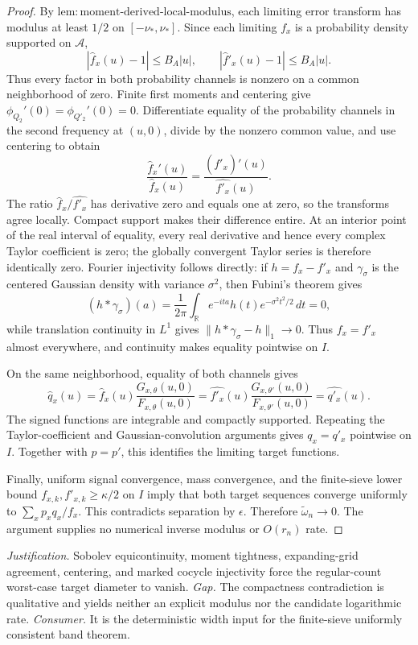 \documentclass{article}
\begin{document}
\begin{proof}
By \(\mathrm{lem{:}moment\text{-}derived\text{-}local\text{-}modulus}\), each limiting error transform has modulus at least \(1/2\) on \([-\nu_*,\nu_*]\). Since each limiting \(f_x\) is a probability density supported on \(\mathcal A\),
\[
 |\widehat f_x(u)-1|\le B_A|u|,
 \qquad |\widehat f'_x(u)-1|\le B_A|u|.
\]
Thus every factor in both probability channels is nonzero on a common neighborhood of zero. Finite first moments and centering give \(\phi_{Q_2}'(0)=\phi_{Q'_2}'(0)=0\). Differentiate equality of the probability channels in the second frequency at \((u,0)\), divide by the nonzero common value, and use centering to obtain
\[
 \frac{\widehat f_x'(u)}{\widehat f_x(u)}
 =\frac{(\widehat{f'_x})'(u)}{\widehat{f'_x}(u)}.
\]
The ratio \(\widehat f_x/\widehat{f'_x}\) has derivative zero and equals one at zero, so the transforms agree locally. Compact support makes their difference entire. At an interior point of the real interval of equality, every real derivative and hence every complex Taylor coefficient is zero; the globally convergent Taylor series is therefore identically zero. Fourier injectivity follows directly: if \(h=f_x-f'_x\) and \(\gamma_\sigma\) is the centered Gaussian density with variance \(\sigma^2\), then Fubini's theorem gives
\[
 (h*\gamma_\sigma)(a)=\frac1{2\pi}\int_{\mathbb R}
 e^{-ita}\widehat h(t)e^{-\sigma^2t^2/2}\,dt=0,
\]
while translation continuity in \(L^1\) gives \(\|h*\gamma_\sigma-h\|_1\to0\). Thus \(f_x=f'_x\) almost everywhere, and continuity makes equality pointwise on \(I\).

On the same neighborhood, equality of both channels gives
\[
 \widehat q_x(u)
 =\widehat f_x(u)\frac{G_{x,\theta}(u,0)}{F_{x,\theta}(u,0)}
 =\widehat{f'_x}(u)\frac{G_{x,\theta'}(u,0)}{F_{x,\theta'}(u,0)}
 =\widehat{q'_x}(u).
\]
The signed functions are integrable and compactly supported. Repeating the Taylor-coefficient and Gaussian-convolution arguments gives \(q_x=q'_x\) pointwise on \(I\). Together with \(p=p'\), this identifies the limiting target functions.

Finally, uniform signal convergence, mass convergence, and the finite-sieve lower bound \(f_{x,k},f'_{x,k}\ge\kappa/2\) on \(I\) imply that both target sequences converge uniformly to \(\sum_xp_xq_x/f_x\). This contradicts separation by \(\epsilon\). Therefore \(\widetilde\omega_n\to0\). The argument supplies no numerical inverse modulus or \(O(r_n)\) rate.
\end{proof}
\par\smallskip\noindent \textit{Justification.} Sobolev equicontinuity, moment tightness, expanding-grid agreement, centering, and marked cocycle injectivity force the regular-count worst-case target diameter to vanish. \textit{Gap.} The compactness contradiction is qualitative and yields neither an explicit modulus nor the candidate logarithmic rate. \textit{Consumer.} It is the deterministic width input for the finite-sieve uniformly consistent band theorem.
\end{document}
